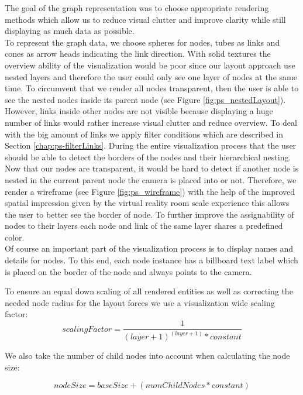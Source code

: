 The goal of the graph representation was to choose appropriate rendering methods which allow us to reduce visual clutter and improve clarity while still displaying as much data as possible.\\
To represent the graph data, we choose spheres for nodes, tubes as links and cones as arrow heads indicating the link direction.
With solid textures the overview ability of the visualization would be poor since our layout approach use nested layers and therefore the user could only see one layer of nodes at the same time. To circumvent that we render all nodes transparent, then the user is able to see the nested nodes inside its parent node (see Figure \ref{fig:ps_nestedLayout}). 
However, links inside other nodes are not visible because displaying a huge number of links would rather increase visual clutter and reduce overview. To deal with the big amount of links we apply filter conditions which are described in Section \ref{chap:ps-filterLinks}.
During the entire visualization process that the user should be able to detect the borders of the nodes and their hierarchical nesting.\\ Now that our nodes are transparent, it would be hard to detect if another node is nested in the current parent node the camera is placed into or not. Therefore, we render a wireframe (see Figure \ref{fig:ps_wireframe}) with the help of the improved spatial impression given by the virtual reality room scale experience this allows the user to better see the border of node. To further improve the assignability of nodes to their layers each node and link of the same layer shares a predefined color.\\
Of course an important part of the visualization process is to display names and details for nodes. To this end, each node instance has a billboard text label which is placed on the border of the node and always points to the camera.

To ensure an equal down scaling of all rendered entities as well as correcting the needed node radius for the layout forces we use a visualization wide scaling factor:
\begin{equation}
    scalingFactor = \frac{1}{(layer+1)^{(layer+1)} * constant}
\end{equation}

We also take the number of child nodes into account when calculating the node size: 

\begin{equation}
    nodeSize = baseSize + (numChildNodes * constant)
\end{equation}

